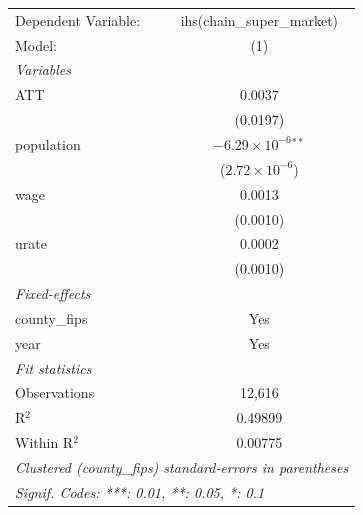 
\begingroup
\centering
\begin{tabular}{lc}
   \tabularnewline \midrule \midrule
   Dependent Variable: & ihs(chain\_super\_market)\\    
   Model:              & (1)\\  
   \midrule
   \emph{Variables}\\
   ATT                 & 0.0037\\   
                       & (0.0197)\\   
   population          & $-6.29\times 10^{-6}$$^{**}$\\    
                       & ($2.72\times 10^{-6}$)\\    
   wage                & 0.0013\\   
                       & (0.0010)\\   
   urate               & 0.0002\\   
                       & (0.0010)\\   
   \midrule
   \emph{Fixed-effects}\\
   county\_fips        & Yes\\  
   year                & Yes\\  
   \midrule
   \emph{Fit statistics}\\
   Observations        & 12,616\\  
   R$^2$               & 0.49899\\  
   Within R$^2$        & 0.00775\\  
   \midrule \midrule
   \multicolumn{2}{l}{\emph{Clustered (county\_fips) standard-errors in parentheses}}\\
   \multicolumn{2}{l}{\emph{Signif. Codes: ***: 0.01, **: 0.05, *: 0.1}}\\
\end{tabular}
\par\endgroup


